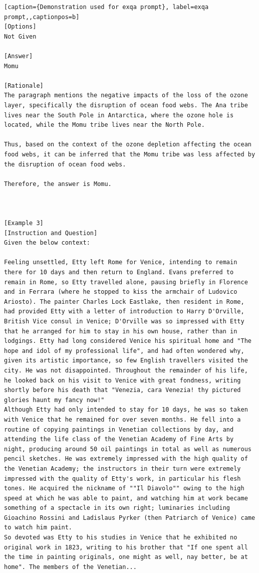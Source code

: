 \begin{lstlisting}[caption={Demonstration used for exqa prompt}, label=exqa prompt,,captionpos=b]
[Options]
Not Given

[Answer]
Momu

[Rationale]
The paragraph mentions the negative impacts of the loss of the ozone layer, specifically the disruption of ocean food webs. The Ana tribe lives near the South Pole in Antarctica, where the ozone hole is located, while the Momu tribe lives near the North Pole.

Thus, based on the context of the ozone depletion affecting the ocean food webs, it can be inferred that the Momu tribe was less affected by the disruption of ocean food webs. 

Therefore, the answer is Momu.



[Example 3]
[Instruction and Question]
Given the below context:

Feeling unsettled, Etty left Rome for Venice, intending to remain there for 10 days and then return to England. Evans preferred to remain in Rome, so Etty travelled alone, pausing briefly in Florence and in Ferrara (where he stopped to kiss the armchair of Ludovico Ariosto). The painter Charles Lock Eastlake, then resident in Rome, had provided Etty with a letter of introduction to Harry D'Orville, British Vice consul in Venice; D'Orville was so impressed with Etty that he arranged for him to stay in his own house, rather than in lodgings. Etty had long considered Venice his spiritual home and "The hope and idol of my professional life", and had often wondered why, given its artistic importance, so few English travellers visited the city. He was not disappointed. Throughout the remainder of his life, he looked back on his visit to Venice with great fondness, writing shortly before his death that "Venezia, cara Venezia! thy pictured glories haunt my fancy now!"
Although Etty had only intended to stay for 10 days, he was so taken with Venice that he remained for over seven months. He fell into a routine of copying paintings in Venetian collections by day, and attending the life class of the Venetian Academy of Fine Arts by night, producing around 50 oil paintings in total as well as numerous pencil sketches. He was extremely impressed with the high quality of the Venetian Academy; the instructors in their turn were extremely impressed with the quality of Etty's work, in particular his flesh tones. He acquired the nickname of ""Il Diavolo"" owing to the high speed at which he was able to paint, and watching him at work became something of a spectacle in its own right; luminaries including Gioachino Rossini and Ladislaus Pyrker (then Patriarch of Venice) came to watch him paint. 
So devoted was Etty to his studies in Venice that he exhibited no original work in 1823, writing to his brother that "If one spent all the time in painting originals, one might as well, nay better, be at home". The members of the Venetian...


\end{lstlisting}
